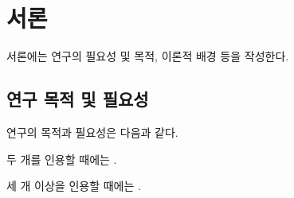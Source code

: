 \section{서론}
서론에는 연구의 필요성 및 목적, 이론적 배경 등을 작성한다.

\subsection{연구 목적 및 필요성}
연구의 목적과 필요성은 다음과 같다\cite{Taylor1989}.

두 개를 인용할 때에는 \cite{aksin,bertram}.

세 개 이상을 인용할 때에는 \cite{Taylor1989,aksin,bertram}.